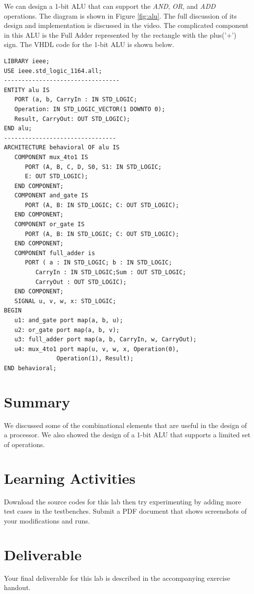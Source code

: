 \documentclass[a4paper, 11pt,oneside]{article}
\begin{document}
We can design a 1-bit ALU that can support the \textit{AND}, \textit{OR}, and \textit{ADD} operations. The diagram is shown in
Figure \ref{fig:alu}. The full discussion of its design and implementation is discussed in the video. The complicated component in this ALU is the Full Adder represented by the rectangle with the plus('+') sign. The VHDL code for the 1-bit ALU is shown below.



\begin{verbatim}
LIBRARY ieee;
USE ieee.std_logic_1164.all;
---------------------------------
ENTITY alu IS
   PORT (a, b, CarryIn : IN STD_LOGIC;
   Operation: IN STD_LOGIC_VECTOR(1 DOWNTO 0);
   Result, CarryOut: OUT STD_LOGIC);
END alu;
--------------------------------
ARCHITECTURE behavioral OF alu IS
   COMPONENT mux_4to1 IS
      PORT (A, B, C, D, S0, S1: IN STD_LOGIC;
      E: OUT STD_LOGIC);
   END COMPONENT;
   COMPONENT and_gate IS
      PORT (A, B: IN STD_LOGIC; C: OUT STD_LOGIC);
   END COMPONENT;
   COMPONENT or_gate IS
      PORT (A, B: IN STD_LOGIC; C: OUT STD_LOGIC);
   END COMPONENT;
   COMPONENT full_adder is
      PORT ( a : IN STD_LOGIC; b : IN STD_LOGIC;
         CarryIn : IN STD_LOGIC;Sum : OUT STD_LOGIC;
         CarryOut : OUT STD_LOGIC);
   END COMPONENT;
   SIGNAL u, v, w, x: STD_LOGIC;
BEGIN
   u1: and_gate port map(a, b, u);
   u2: or_gate port map(a, b, v);
   u3: full_adder port map(a, b, CarryIn, w, CarryOut); 
   u4: mux_4to1 port map(u, v, w, x, Operation(0), 
               Operation(1), Result);
END behavioral;
\end{verbatim}





\section{Summary}
We discussed some of the combinational elements that are useful in the design of a processor. We also showed the design of a 1-bit ALU that supports a limited set of operations.

\section{Learning Activities}
Download the source codes for this lab then try experimenting by adding more test cases in the testbenches. Submit a PDF document that shows screenshots of your modifications and runs.

\section{Deliverable}
Your final deliverable for this lab is described in the accompanying exercise handout.




\nocite{*}
\end{document}
